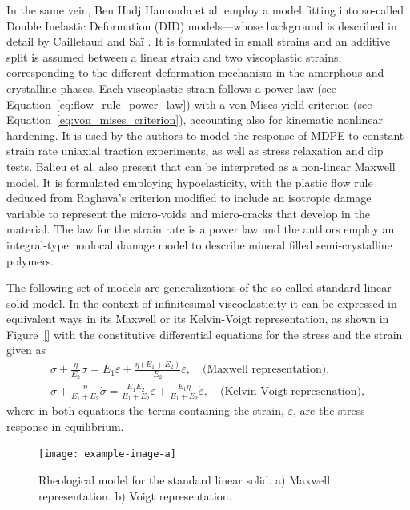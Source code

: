 In the same vein, Ben Hadj Hamouda et al. \citep{benhadjhamoudaViscoplasticBehaviourMedium2007} employ a model fitting into so-called Double Inelastic Deformation (DID) models---whose background is described in detail by Cailletaud and Saï \citep{cailletaudStudyPlasticViscoplastic1995}.
It is formulated in small strains and an additive split is assumed between a linear strain and two viscoplastic strains, corresponding to the different deformation mechanism in the amorphous and crystalline phases.
Each viscoplastic strain follows a power law (see Equation~\eqref{eq:flow_rule_power_law}) with a von Mises yield criterion (see Equation~\eqref{eq:von_mises_criterion}), accounting also for kinematic nonlinear hardening.
It is used by the authors to model the response of MDPE to constant strain rate uniaxial traction experiments, as well as stress relaxation and dip tests.
Balieu et al. \citep{balieuNonassociatedViscoplasticityCoupled2014} also present that can be interpreted as a non-linear Maxwell model.
It is formulated employing hypoelasticity, with the plastic flow rule deduced from Raghava's criterion modified to include an isotropic damage variable to represent the micro-voids and micro-cracks that develop in the material.
The law for the strain rate is a power law and the authors employ an integral-type nonlocal damage model to describe mineral filled semi-crystalline polymers.

The following set of models are generalizations of the so-called standard linear solid model.
In the context of infinitesimal viscoelasticity it can be expressed in equivalent ways in its Maxwell or its Kelvin-Voigt representation, as shown in Figure~\ref{} with the constitutive differential equations for the stress and the strain given as
\begin{gather}
	\sigma+\frac{\eta}{E_2} \dot{\sigma}=E_1 \varepsilon+\frac{\eta\left(E_1+E_2\right)}{E_2} \dot{\varepsilon},\quad\text{(Maxwell representation)},
	\label{eq:sls_maxwell_rep}\\
	\sigma+\frac{\eta}{E_1+E_2} \dot{\sigma}=\frac{E_1 E_2}{E_1+E_2} \varepsilon+\frac{E_1 \eta}{E_1+E_2} \dot{\varepsilon},\quad\text{(Kelvin-Voigt represenation)},
	\label{eq:sls_voigt_rep}
\end{gather}
where in both equations the terms containing the strain, $\varepsilon$, are the stress response in equilibrium.
\begin{figure}
	\centering
	\texttt{[image: example-image-a]}
	\caption{Rheological model for the standard linear solid. a) Maxwell representation. b) Voigt representation.}
\end{figure}

